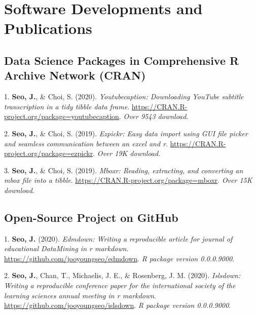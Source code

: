 \documentclass[11pt,a4paper,]{awesome-cv}
\begin{document}
\hypertarget{software-developments-and-publications}{%
\section{Software Developments and
Publications}\label{software-developments-and-publications}}

\hypertarget{data-science-packages-in-comprehensive-r-archive-network-cran}{%
\subsection{Data Science Packages in Comprehensive R Archive Network
(CRAN)}\label{data-science-packages-in-comprehensive-r-archive-network-cran}}

\hypertarget{bibliography}{}
\leavevmode{}%
1. \textbf{Seo, J.}, \& Choi, S. (2020). \emph{Youtubecaption:
Downloading YouTube subtitle transcription in a tidy tibble data frame}.
\url{https://CRAN.R-project.org/package=youtubecaption}. \emph{Over 9543
download}.

\leavevmode{}%
2. \textbf{Seo, J.}, \& Choi, S. (2019). \emph{Ezpickr: Easy data import
using GUI file picker and seamless communication between an excel and
r}. \url{https://CRAN.R-project.org/package=ezpickr}. \emph{Over 19K
download}.

\leavevmode{}%
3. \textbf{Seo, J.}, \& Choi, S. (2019). \emph{Mboxr: Reading,
extracting, and converting an mbox file into a tibble}.
\url{https://CRAN.R-project.org/package=mboxr}. \emph{Over 15K
download}.

\newpage

\hypertarget{open-source-project-on-github}{%
\subsection{Open-Source Project on
GitHub}\label{open-source-project-on-github}}

\hypertarget{bibliography}{}
\leavevmode{}%
1. \textbf{Seo, J.} (2020). \emph{Edmdown: Writing a reproducible
article for journal of educational DataMining in r markdown}.
\url{https://github.com/jooyoungseo/edmdown}. \emph{R package version
0.0.0.9000}.

\leavevmode{}%
2. \textbf{Seo, J.}, Chan, T., Michaelis, J. E., \& Rosenberg, J. M.
(2020). \emph{Islsdown: Writing a reproducible conference paper for the
international society of the learning sciences annual meeting in r
markdown}. \url{https://github.com/jooyoungseo/islsdown}. \emph{R
package version 0.0.0.9000}.
\end{document}
